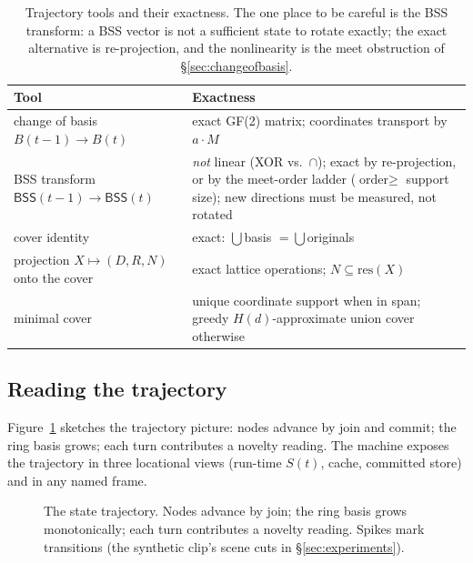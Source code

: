 \documentclass[11pt,a4paper]{article}
\theoremstyle{remark}
\newcommand{\BSS}{\ensuremath{\mathsf{BSS}}}          %
\newcommand{\res}{\ensuremath{\mathrm{res}}}          %
\begin{document}
\begin{table}[t]
\centering
\small
\begin{tabular}{@{}p{}p{}@{}}
\toprule
Tool & Exactness \\
\midrule
change of basis $B(t{-}1)\to B(t)$ & exact GF(2) matrix; coordinates transport by $a\cdot M$ \\
BSS transform $\BSS(t{-}1)\to\BSS(t)$ & \emph{not} linear (XOR vs.\ $\cap$); exact by re-projection, or by the meet-order ladder ($\text{order}\ge$ support size); new directions must be measured, not rotated \\
cover identity & exact: $\bigcup$basis $=\bigcup$originals \\
projection $X\mapsto(D,R,N)$ onto the cover & exact lattice operations; $N\subseteq\res(X)$ \\
minimal cover & unique coordinate support when in span; greedy $H(d)$-approximate union cover otherwise \\
\bottomrule
\end{tabular}
\caption{Trajectory tools and their exactness. The one place to be careful is the
BSS transform: a BSS vector is not a sufficient state to rotate exactly; the
exact alternative is re-projection, and the nonlinearity is the meet
obstruction of \S\ref{sec:changeofbasis}.}
\label{tab:tools}
\end{table}

\subsection{Reading the trajectory}

Figure~\ref{fig:trajectory} sketches the trajectory picture: nodes advance by
join and commit; the ring basis grows; each turn contributes a novelty reading.
The machine exposes the trajectory in three locational views (run-time $S(t)$,
cache, committed store) and in any named frame.

\begin{figure}[t]
\centering
{}
\caption{The state trajectory. Nodes advance by join; the ring basis grows
monotonically; each turn contributes a novelty reading. Spikes mark transitions
(the synthetic clip's scene cuts in \S\ref{sec:experiments}).}
\label{fig:trajectory}
\end{figure}
\end{document}

